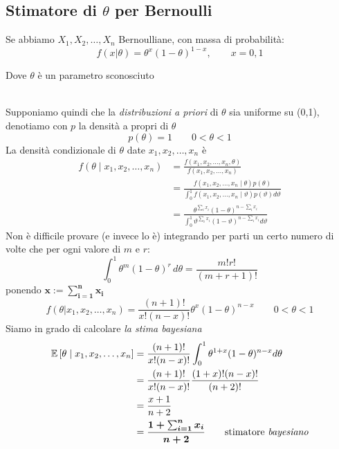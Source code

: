 \documentclass[]{article}
\newcommand{\ev}{\mathbb{E}[X]}
\renewcommand{\ev}[1]{\mathbb{E}\left[#1\right]}
\begin{document}
    \subsection{Stimatore di $\theta$ per Bernoulli}
    Se abbiamo $X_1, X_2, \ldots, X_n$ Bernoulliane, con massa di probabilità:
    \[ f(x \rvert \theta) = \theta^x (1-\theta)^{1-x}, \qquad x = 0,1 \]
    \centerline{Dove $\theta$ è un parametro sconosciuto} \\[2ex]
    Supponiamo quindi che la \textit{distribuzioni a priori} di $\theta$ sia uniforme su (0,1), denotiamo con $p$ la densità a propri di $\theta$
    \[ p(\theta)=1 \qquad 0 < \theta < 1 \]
    La densità condizionale di $\theta$ date $x_1, x_2, \ldots, x_n$ è 
    \begin{equation}
        \begin{aligned}
        f\left(\theta \mid x_1, x_2, \ldots, x_n\right) & =\frac{f\left(x_1, x_2, \ldots, x_n, \theta\right)}{f\left(x_1, x_2, \ldots, x_n\right)} \\
        & =\frac{f\left(x_1, x_2, \ldots, x_n \mid \theta\right) p(\theta)}{\int_0^1 f\left(x_1, x_2, \ldots, x_n \mid \vartheta\right) p(\vartheta) d \vartheta} \\
        & =\frac{\theta^{\sum_i x_i}(1-\theta)^{n-\sum_i x_i}}{\int_0^1 \vartheta^{\sum_i x_i}(1-\vartheta)^{n-\sum_i x_i} d \vartheta}
        \end{aligned}
    \end{equation}
    Non è difficile provare (e invece lo è) integrando per parti un certo numero di volte che per ogni valore di $m$ e $r$:
    \[ \int_{0}^{1} \theta^m (1-\theta)^r \, d\theta = \frac{m! r!}{(m+r+1)!} \]
    ponendo $\boldsymbol{x := \sum_{i=1}^{n} x_i}$
    \[ f(\theta \rvert x_1, x_2, \ldots, x_n) = \frac{(n+1)!}{x! (n-x)!} \theta^x (1-\theta)^{n-x} \qquad 0 < \theta < 1 \]
    Siamo in grado di calcolare \textit{la stima bayesiana}
    \begin{equation}
        \begin{aligned}
        \ev{\theta \mid x_1, x_2, \ldots, x_n} & =\frac{(n+1) !}{x !(n-x) !} \int_0^1 \theta^{1+x}(1-\theta)^{n-x} d \theta \\
        &=\frac{(n+1) !}{x !(n-x) !} \frac{(1+x) !(n-x) !}{(n+2) !} \\
        &= \frac{x+1}{n+2} \\
        &= \boldsymbol{\frac{1 + \sum_{i=1}^{n} x_i}{n + 2}} \qquad \text{stimatore \textit{bayesiano}}
        \end{aligned}
    \end{equation}
\end{document}
